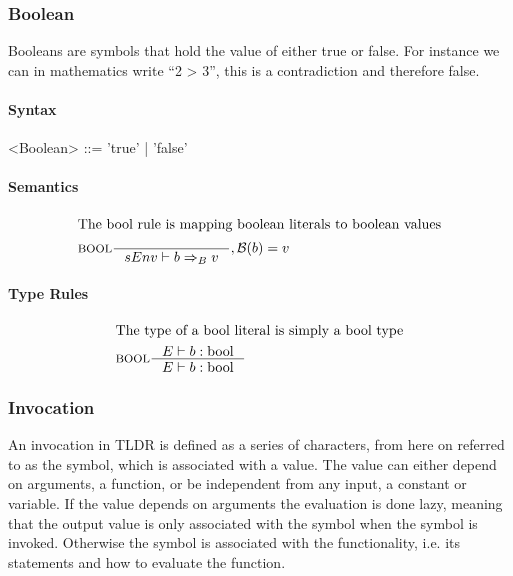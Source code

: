 \subsubsection{Boolean}
Booleans are symbols that hold the value of either true or false. For instance we can in mathematics write \enquote{2 > 3}, this is a contradiction and therefore false.

\paragraph{Syntax}

\begin{grammar}
<Boolean> ::= 'true' | 'false'
\end{grammar}

\paragraph{Semantics}

\begin{align*}
\intertext{The bool rule is mapping boolean literals to boolean values}
&\inference[BOOL]{}
                 {sEnv \vdash b \Rightarrow_B v}
                  {, \mathcal{B}(b) = v}
\end{align*}

\paragraph{Type Rules}

\begin{align*}
\intertext{The type of a bool literal is simply a bool type}
&\inference[BOOL]{\Tenv b:\Tbool}
                 {\Tenv b: \Tbool}
\end{align*}

\subsubsection{Invocation}\label{subsubsec:invocation}
An invocation in TLDR is defined as a series of characters, from here on referred to as the symbol, which is associated with a value. The value can either depend on arguments, a function, or be independent from any input, a constant or variable. If the value depends on arguments the evaluation is done lazy, meaning that the output value is only associated with the symbol when the symbol is invoked. Otherwise the symbol is associated with the functionality, i.e. its statements and how to evaluate the function. 

